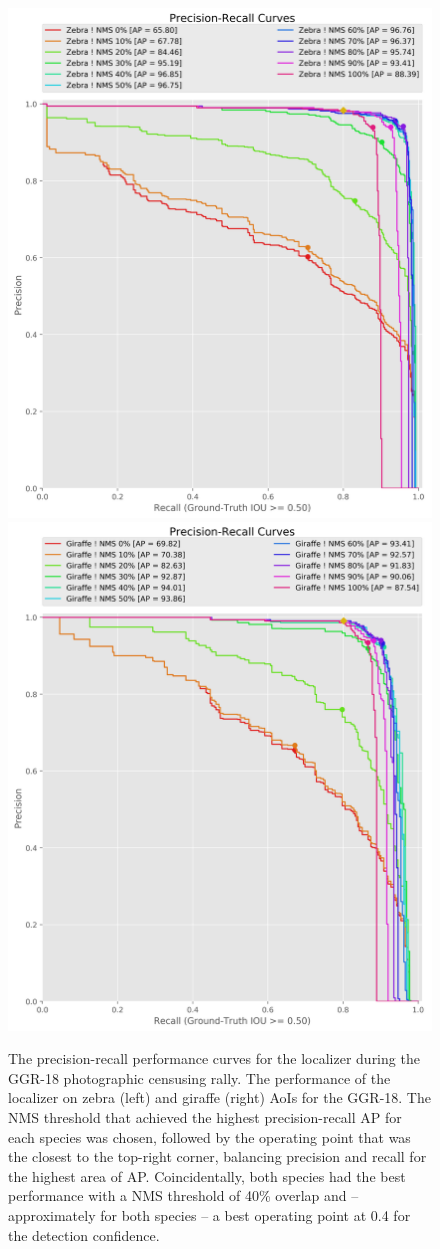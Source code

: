 \begin{figure}[!t]
    \begin{center}
        \includegraphics[width=0.45\linewidth]{resources/ggr2-!zebra-lightnet-localizer-precision-recall-50.pdf}
        \vspace{2mm}
        \includegraphics[width=0.45\linewidth]{resources/ggr2-!giraffe-lightnet-localizer-precision-recall-50.pdf}
    \end{center}
    \caption{The precision-recall performance curves for the localizer during the GGR-18 photographic censusing rally.  The performance of the localizer on zebra (left) and giraffe (right) AoIs for the GGR-18.  The NMS threshold that achieved the highest precision-recall AP for each species was chosen, followed by the operating point that was the closest to the top-right corner, balancing precision and recall for the highest area of AP.  Coincidentally, both species had the best performance with a NMS threshold of 40\% overlap and -- approximately for both species -- a best operating point at 0.4 for the detection confidence.}
    \label{fig:performance-localizer-ggr}
\end{figure}


